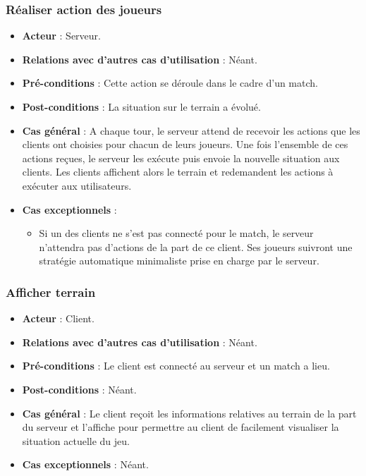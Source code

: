 \documentclass[a4paper,titlepage]{scrreprt}
\begin{document}
    \subsubsection{Réaliser action des joueurs}
      \begin{itemize}
        \item \textbf{Acteur}  : Serveur.
        \item \textbf{Relations avec d'autres cas d'utilisation}  : Néant.
        \item \textbf{Pré-conditions} : Cette action se déroule dans le cadre d'un match.
        \item \textbf{Post-conditions} : La situation sur le terrain a évolué.
        \item \textbf{Cas général} : A chaque tour, le serveur attend de recevoir les actions que les clients ont choisies pour chacun de leurs joueurs. Une fois l’ensemble de ces actions reçues, le serveur les exécute puis envoie la nouvelle situation aux clients. Les clients affichent alors le terrain et redemandent les actions à exécuter aux utilisateurs.
        \item \textbf{Cas exceptionnels} : 
          \begin{itemize}
            \item Si un des clients ne s’est pas connecté pour le match, le serveur n’attendra pas d’actions de la part de ce client. Ses joueurs suivront une stratégie automatique minimaliste prise en charge par le serveur.
          \end{itemize}  
      \end{itemize}
    \subsubsection{Afficher terrain}
      \begin{itemize}
        \item \textbf{Acteur}  : Client.
        \item \textbf{Relations avec d'autres cas d'utilisation}  : Néant.
        \item \textbf{Pré-conditions} : Le client est connecté au serveur et un match a lieu.
        \item \textbf{Post-conditions} : Néant.
        \item \textbf{Cas général} : Le client reçoit les informations relatives au terrain de la part du serveur et l’affiche pour permettre au client de facilement visualiser la situation actuelle du jeu.
        \item \textbf{Cas exceptionnels} : Néant. 
      \end{itemize}
\end{document}
